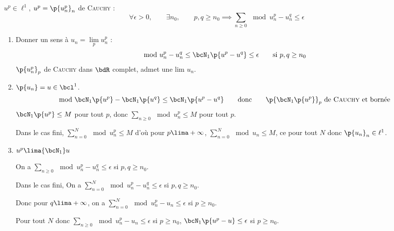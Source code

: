 \documentclass[a4paper,french,bookmarks]{book}
\begin{document}
    $u^p \in \ell^1$, $u^p = \p{u_n^p}_n$ de \textsc{Cauchy} :
    \[ \forall \epsilon > 0,\qquad \exists n_0,\qquad p, q \geq n_0 \implies \sum_{n \geq 0} \mod{u_n^p - u_n^q} \leq \epsilon\]
    
    \begin{enumerate}
        \item Donner un sens à $u_n = \lim\limits_p u_n^p$ :
        \[ \mod{u_n^p - u_n^q} \leq \bcN_1\p{u^p - u^q} \leq \epsilon \qquad\text{si} \ p, q \geq n_0\]
        \ie $\p{u_n^p}_p$ de \textsc{Cauchy} dans $\bdR$ complet, admet une lim $u_n$.
        
        \item $\p{u_n} = u \in \bcl^1$.
        \[ \mod{\bcN_1\p{u^p} - \bcN_1\p{u^q}} \leq \bcN_1\p{u^p - u^q} \qquad\text{donc}\qquad \p{\bcN_1\p{u^p}}_p \ \text{de \textsc{Cauchy} et bornée}\]
        $\bcN_1\p{u^p} \leq M$ pour tout $p$, donc $\sum_{n \geq 0} \mod{u_n^p} \leq M$ pour tout $p$.
        
        Dans le cas fini, $\sum\limits_{n = 0}^N \mod{u_n^p} \leq M$ d'où pour $p \lima +\infty$, $\sum_{n=0}^N \mod{u_n} \leq M$, ce pour tout $N$ donc $\p{u_n}_n \in \ell^1$.
        
        \item $u^p \lima{\bcN_1} u$
        
        On a $\sum\limits_{n \geq 0} \mod{u_n^p - u_n^q} \leq \epsilon$ si $p, q \geq n_0$.
        
        Dans le cas fini, On a $\sum\limits_{n = 0}^N \mod{u_n^p - u_n^q} \leq \epsilon$ si $p, q \geq n_0$.
        
        Donc pour $q \lima +\infty$, on a $\sum\limits_{n = 0}^N \mod{u_n^p - u_n} \leq \epsilon$ si $p \geq n_0$.
        
        Pour tout $N$ donc $\sum\limits_{n \geq 0} \mod{u_n^p - u_n} \leq \epsilon$ si $p \geq n_0$, \ie $\bcN_1\p{u^p - u} \leq \epsilon$ si $p \geq n_0$.
    \end{enumerate}
    
\end{document}
